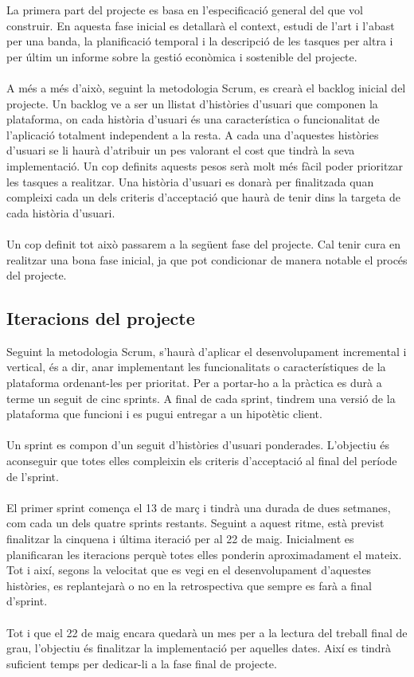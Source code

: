 La primera part del projecte es basa en l’especificació general del que vol construir. En aquesta fase inicial es detallarà el context, estudi de l’art i l’abast per una banda, la planificació temporal i la descripció de les tasques per altra i per últim un informe sobre la gestió econòmica i sostenible del projecte.
\\\\
A més a més d’això, seguint la metodologia Scrum, es crearà el backlog inicial del projecte. Un backlog ve a ser un llistat d’històries d’usuari que componen la plataforma, on cada història d’usuari és una característica o funcionalitat de l’aplicació totalment independent a la resta. A cada una d’aquestes històries d’usuari se li haurà d’atribuir un pes valorant el cost que tindrà la seva implementació. Un cop definits aquests pesos serà molt més fàcil poder prioritzar les tasques a realitzar. Una història d’usuari es donarà per finalitzada quan compleixi cada un dels criteris d’acceptació que haurà de tenir dins la targeta de cada història d’usuari.
\\\\
Un cop definit tot això passarem a la següent fase del projecte. Cal tenir cura en realitzar una bona fase inicial, ja que pot condicionar de manera notable el procés del projecte.

\subsection{Iteracions del projecte}

Seguint la metodologia Scrum, s’haurà d’aplicar el desenvolupament incremental i vertical, és a dir, anar implementant les funcionalitats o característiques de la plataforma ordenant-les per prioritat. Per a portar-ho a la pràctica es durà a terme un seguit de cinc sprints. A final de cada sprint, tindrem una versió de la plataforma que funcioni i es pugui entregar a un hipotètic client.
\\\\
Un sprint es compon d’un seguit d’històries d’usuari ponderades. L’objectiu és aconseguir que totes elles compleixin els criteris d’acceptació al final del període de l’sprint.
\\\\
El primer sprint comença el 13 de març i tindrà una durada de dues setmanes, com cada un dels quatre sprints restants. Seguint a aquest ritme, està previst finalitzar la cinquena i última iteració per al 22 de maig. Inicialment es planificaran les iteracions perquè totes elles ponderin aproximadament el mateix. Tot i així, segons la velocitat que es vegi en el desenvolupament d’aquestes històries, es replantejarà o no en la retrospectiva que sempre es farà a final d’sprint.
\\\\
Tot i que el 22 de maig encara quedarà un mes per a la lectura del treball final de grau, l’objectiu és finalitzar la implementació per aquelles dates. Així es tindrà suficient temps per dedicar-li a la fase final de projecte.

